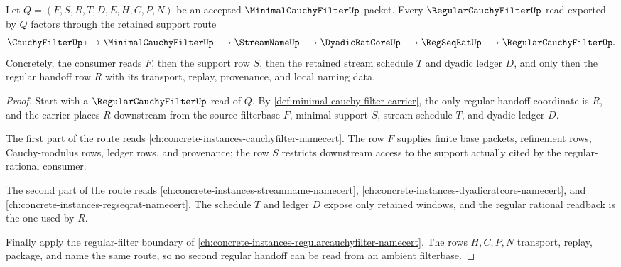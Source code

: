 \begin{theorem}\label{thm:minimal-cauchy-filter-regular-handoff}
Let $Q=(F,S,R,T,D,E,H,C,P,N)$ be an accepted $\MinimalCauchyFilterUp$ packet. Every $\RegularCauchyFilterUp$ read exported by $Q$ factors through the retained support route
$$
\CauchyFilterUp \longmapsto \MinimalCauchyFilterUp \longmapsto \StreamNameUp \longmapsto \DyadicRatCoreUp \longmapsto \RegSeqRatUp \longmapsto \RegularCauchyFilterUp .
$$
Concretely, the consumer reads $F$, then the support row $S$, then the retained stream schedule $T$ and dyadic ledger $D$, and only then the regular handoff row $R$ with its transport, replay, provenance, and local naming data.
\end{theorem}
\begin{proof}
Start with a $\RegularCauchyFilterUp$ read of $Q$. By \autoref{def:minimal-cauchy-filter-carrier}, the only regular handoff coordinate is $R$, and the carrier places $R$ downstream from the source filterbase $F$, minimal support $S$, stream schedule $T$, and dyadic ledger $D$.

The first part of the route reads \autoref{ch:concrete-instances-cauchyfilter-namecert}. The row $F$ supplies finite base packets, refinement rows, Cauchy-modulus rows, ledger rows, and provenance; the row $S$ restricts downstream access to the support actually cited by the regular-rational consumer.

The second part of the route reads \autoref{ch:concrete-instances-streamname-namecert}, \autoref{ch:concrete-instances-dyadicratcore-namecert}, and \autoref{ch:concrete-instances-regseqrat-namecert}. The schedule $T$ and ledger $D$ expose only retained windows, and the regular rational readback is the one used by $R$.

Finally apply the regular-filter boundary of \autoref{ch:concrete-instances-regularcauchyfilter-namecert}. The rows $H,C,P,N$ transport, replay, package, and name the same route, so no second regular handoff can be read from an ambient filterbase.
\end{proof}

